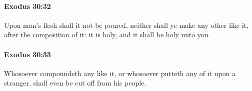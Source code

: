 		\paragraph{Exodus 30:32} %
			\label{EXODUS-30-32}

			Upon man's flesh shall it not be poured, neither shall ye make any other like it, after the composition of it: it is holy, and it shall be holy unto you.


		\paragraph{Exodus 30:33} %
			\label{EXODUS-30-33}

			Whosoever compoundeth any like it, or whosoever putteth any of it upon a stranger, shall even be cut off from his people.


